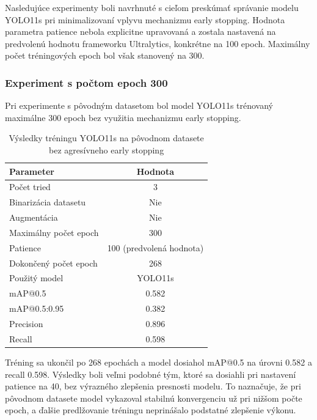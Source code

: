             Nasledujúce experimenty boli navrhnuté s cieľom preskúmať správanie modelu YOLO11s pri minimalizovaní vplyvu mechanizmu early stopping. Hodnota parametra patience nebola explicitne upravovaná a zostala nastavená na predvolenú hodnotu frameworku Ultralytics, konkrétne na 100 epoch. Maximálny počet tréningových epoch bol však stanovený na 300.

                \subsubsection{Experiment s počtom epoch 300}

                Pri experimente s pôvodným datasetom bol model YOLO11s trénovaný maximálne 300 epoch bez využitia mechanizmu early stopping.

                \begin{table}[H]
                    \centering
                    \begin{tabular}{|l|c|}
                    \hline
                    \textbf{Parameter} & \textbf{Hodnota} \\ \hline
                    Počet tried & 3 \\ \hline
                    Binarizácia datasetu & Nie \\ \hline
                    Augmentácia & Nie \\ \hline
                    Maximálny počet epoch & 300 \\ \hline
                    Patience & 100 (predvolená hodnota) \\ \hline
                    Dokončený počet epoch & 268 \\ \hline
                    Použitý model & YOLO11s \\ \hline
                    mAP@0.5 & 0.582 \\ \hline
                    mAP@0.5:0.95 & 0.382 \\ \hline
                    Precision & 0.896 \\ \hline
                    Recall & 0.598 \\ \hline
                    \end{tabular}
                    \caption{Výsledky tréningu YOLO11s na pôvodnom datasete bez agresívneho early stopping}
                    \label{tab:yolo11s_default_300}
                \end{table}

                Tréning sa ukončil po 268 epochách a model dosiahol mAP@0.5 na úrovni 0.582 a recall 0.598. Výsledky boli veľmi podobné tým, ktoré sa dosiahli pri nastavení patience na 40, bez výrazného zlepšenia presnosti modelu. To naznačuje, že pri pôvodnom datasete model vykazoval stabilnú konvergenciu už pri nižšom počte epoch, a ďalšie predlžovanie tréningu neprinášalo podstatné zlepšenie výkonu.

